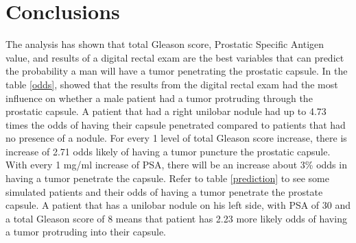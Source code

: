 \documentclass{article}\usepackage[]{graphicx}\usepackage[]{color}
\begin{document}
\section{Conclusions}
\quad 
The analysis has shown that total Gleason score, Prostatic Specific Antigen value, and results of a digital rectal exam are the best variables that can predict the probability a man will have a tumor penetrating the prostatic capsule. In the table \ref{odds}, showed that the results from the digital rectal exam had the most influence on whether a male patient had a tumor protruding through the prostatic capsule. A patient that had a right unilobar nodule had up to 4.73 times the odds of having their capsule penetrated compared to patients that had no presence of a nodule. For every 1 level of total Gleason score increase, there is increase of 2.71 odds likely of having a tumor puncture the prostatic capsule. With every 1 mg/ml increase of PSA, there will be an increase about 3\% odds in having a tumor penetrate the capsule.
Refer to table \ref{prediction} to see some simulated patients and their odds of having a tumor penetrate the prostate capsule. A patient that has a unilobar nodule on his left side, with PSA of 30 and a total Gleason score of 8 means that patient has 2.23 more likely odds of having a tumor protruding into their capsule.
\end{document}
